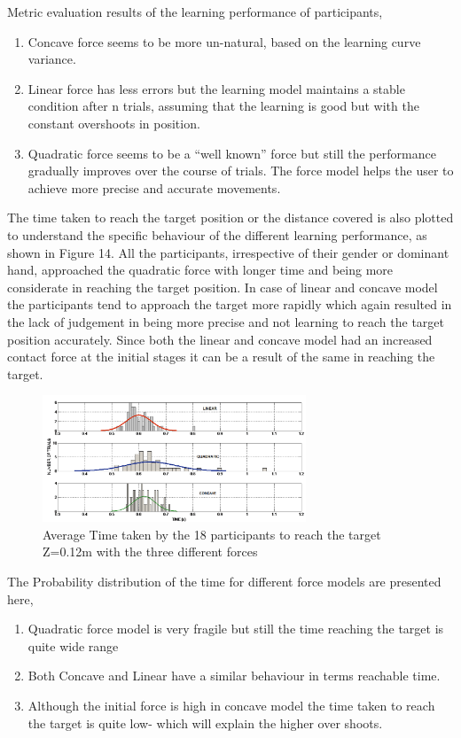 Metric evaluation results of the learning performance of  participants,
\begin{enumerate} 
	
	\item Concave force seems to be more un-natural, based on the learning curve variance.
	
	\item Linear force has less errors but the learning model maintains a stable condition after n trials, assuming that the learning is good but with the constant overshoots in position. 
	
	\item	Quadratic force seems to be a “well known” force but still the performance gradually improves over the course of trials. The force model helps the user to achieve more precise and accurate movements. 
	\end {enumerate}
	
	The time taken to reach the target position or the distance covered is also plotted to understand the specific behaviour of the different learning performance, as shown in Figure 14. All the participants, irrespective of their gender or dominant hand, approached the quadratic force with longer time and being more considerate in reaching the target position. In case of linear and concave model the participants tend to approach the target more rapidly which again resulted in the lack of judgement in being more precise and not learning to reach the target position accurately. Since both the linear and concave model had an increased contact force at the initial stages it can be a result of the same in reaching the target.
	\begin{figure}
		\centering
		\includegraphics[width=0.7\textwidth]{Chie/figs/Figure14.png}
		\caption{Average Time taken by the 18 participants to reach the target Z=0.12m with the three different forces }
		\label{speed}
	\end{figure}
	The Probability distribution of the time for different force models are presented here, 
	\begin{enumerate}
		
		\item	Quadratic force model is very fragile but still the time reaching the target is quite wide range
		
		\item	Both Concave and Linear have a similar behaviour in terms reachable time. 
		
		\item	Although the initial force is high in concave model the time taken to reach the target is quite low- which will explain the higher over shoots. 
	\end{enumerate}
	
